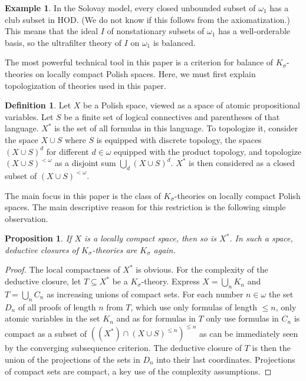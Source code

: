 \documentclass{article}
\newcommand{\gw}{\omega}
\newcommand{\gs}{\sigma}
\newcommand{\hvd}{\mathrm{HOD}}
\newtheorem{proposition}[theorem]{Proposition}
\theoremstyle{definition}
\newtheorem{definition}[theorem]{Definition}
\newtheorem{example}[theorem]{Example}
\begin{document}
\begin{example}
	In the Solovay model, every closed unbounded subset of $\gw_1$ has a club subset in $\hvd$. (We do not know if this follows from the axiomatization.) This means that the ideal $I$ of nonstationary subsets of $\gw_1$ has a well-orderable basis, so the ultrafilter theory of $I$ on $\gw_1$ is balanced.
\end{example}

\noindent The most powerful technical tool in this paper is a criterion for balance of $K_\gs$-theories on locally compact Polish spaces. Here, we must first explain topologization of theories used in this paper.

\begin{definition}
	Let $X$ be a Polish space, viewed as a space of atomic propositional variables. Let $S$ be a finite set of logical connectives and parentheses of that language. $X^*$ is the set of all formulas in this language. To topologize it, consider the space $X\cup S$ where $S$ is equipped with discrete topology, the spaces $(X\cup S)^d$ for different $d\in\gw$ equipped with the product topology, and topologize $(X\cup S)^{<\gw}$ as a disjoint sum $\bigcup_d(X\cup S)^d$. $X^*$ is then considered as a closed subset of $(X\cup S)^{<\gw}$.
\end{definition}

\noindent The main focus in this paper is the class of $K_\gs$-theories on locally compact Polish spaces. The main descriptive reason for this restriction is the following simple observation.

\begin{proposition}
If $X$ is a locally compact space, then so is $X^*$. In such a space, deductive closures of $K_\gs$-theories are $K_\gs$ again. 
\end{proposition}

\begin{proof}
The local compactness of $X^*$ is obvious. For the complexity of the deductive closure, let $T\subseteq X^*$ be a $K_\gs$-theory. Express $X=\bigcup_nK_n$ and $T=\bigcup_nC_n$ as increasing unions of compact sets. For each number $n\in\gw$ the set $D_n$ of all proofs of length $n$ from $T$, which use only formulas of length $\leq n$, only atomic variables in the set $K_n$ and as for formulas in $T$ only use formulas in $C_n$ is compact as a subset of $((X^*)\cap (X\cup S)^{\leq n})^{\leq n}$ as can be immediately seen by the converging subsequence criterion. The deductive closure of $T$ is then the union of the projections of the sets in $D_n$ into their last coordinates. Projections of compact sets are compact, a key use of the complexity assumptions.
\end{proof}
\end{document}
